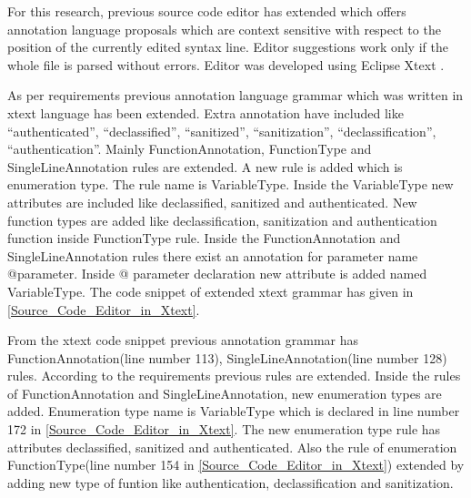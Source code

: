 For this research, previous source code editor \cite{ref_108_paul2015infoflow} has extended which offers annotation language proposals which are context sensitive with respect to the position of the currently edited syntax line. Editor suggestions work only if the whole file is parsed without errors. Editor was developed using Eclipse Xtext \cite{ref_17_xtext:grammar}.

As per requirements previous annotation language grammar \cite{ref_108_paul2015infoflow} which was written in xtext language has been extended. Extra annotation have included like \enquote{authenticated}, \enquote{declassified}, \enquote{sanitized}, \enquote{sanitization}, \enquote{declassification}, \enquote{authentication}. Mainly FunctionAnnotation, FunctionType  and SingleLineAnnotation rules  are extended. A new rule is added which is enumeration type. The rule name is VariableType. Inside the VariableType new attributes are included like declassified, sanitized and authenticated. New function types are added like declassification, sanitization and authentication function inside FunctionType rule. Inside the FunctionAnnotation and SingleLineAnnotation rules there exist an annotation for parameter name @parameter. Inside @ parameter declaration new attribute is added named VariableType. The code snippet of extended xtext grammar has given in \ref{Source_Code_Editor_in_Xtext}. 


From the xtext code snippet previous annotation grammar \cite{ref_108_paul2015infoflow} has FunctionAnnotation(line number 113), SingleLineAnnotation(line number 128) rules. According to the requirements previous rules are extended. Inside the rules of FunctionAnnotation and SingleLineAnnotation, new enumeration types are added. Enumeration type name is VariableType which is declared in line number 172 in \ref{Source_Code_Editor_in_Xtext}. The new enumeration type rule has attributes declassified, sanitized and authenticated. Also the rule of enumeration FunctionType(line number 154 in \ref{Source_Code_Editor_in_Xtext}) extended by adding new type of funtion like authentication, declassification and sanitization.


